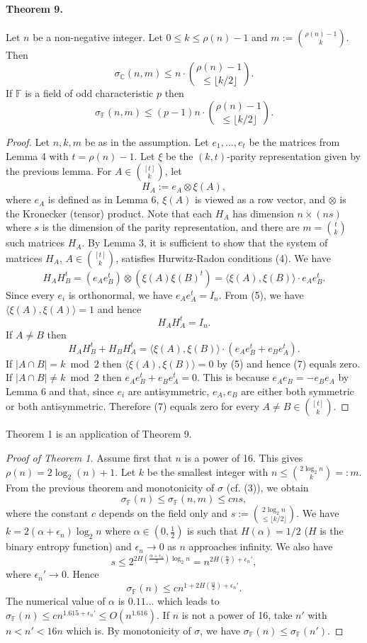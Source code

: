 \documentclass[10pt,a4paper]{article}
\begin{document}
\paragraph{Theorem 9.} Let $n$ be a non-negative integer. Let $0\le k\le\rho(n)-1$ and $m:=\binom{\rho(n)-1}k$. Then
\[\sigma_{\mathbb C}(n,m)\le n\cdot\binom{\rho(n)-1}{\le\lfloor k/2\rfloor}.\]
If $\mathbb F$ is a field of odd characteristic $p$ then
\[\sigma_{\mathbb F}(n,m)\le(p-1)n\cdot\binom{\rho(n)-1}{\le\lfloor k/2\rfloor}.\]
\begin{proof}
Let $n,k,m$ be as in the assumption. Let $e_1,\ldots,e_t$ be the matrices from Lemma 4 with $t=\rho(n)-1$. Let $\xi$ be the $(k,t)$-parity representation given by the previous lemma. For $A\in\binom{[t]}k$, let
\[H_A:=e_A\otimes\xi(A),\]
where $e_A$ is defined as in Lemma 6, $\xi(A)$ is viewed as a row vector, and $\otimes$ is the Kronecker (tensor) product.
Note that each $H_A$ has dimension $n\times(ns)$ where $s$ is the dimension of the parity representation, and there are $m=\binom tk$ such matrices $H_A$. By Lemma 3, it is sufficient to show that the system of matrices $H_A$, $A\in\binom{[t]}k$, satisfies Hurwitz-Radon conditions (4).
We have
\[H_AH_B^t=(e_Ae_B^t)\otimes(\xi(A)\xi(B)^t)=\langle\xi(A),\xi(B)\rangle\cdot e_Ae_B^t.\]
Since every $e_i$ is orthonormal, we have $e_Ae_A^t=I_n$. From (5), we have $\langle\xi(A),\xi(A)\rangle=1$ and hence
\[H_AH_A^t=I_n.\]
If $A\ne B$ then
\begin{equation}
H_AH_B^t+H_BH_A^t=\langle\xi(A),\xi(B)\rangle\cdot(e_Ae_B^t+e_Be_A^t).\tag{7}
\end{equation}
If $|A\cap B|=k\bmod2$ then $\langle\xi(A),\xi(B)\rangle=0$ by (5) and hence (7) equals zero. If $|A\cap B|\ne k\bmod2$ then $e_Ae_B^t+e_Be_A^t=0$. This is because $e_Ae_B=-e_Be_A$ by Lemma 6 and that, since $e_i$ are antisymmetric, $e_A,e_B$ are either both symmetric or both antisymmetric. Therefore (7) equals zero for every $A\ne B\in\binom{[t]}k$.
\end{proof}
Theorem 1 is an application of Theorem 9.
\begin{proof}[Proof of Theorem 1]
Assume first that $n$ is a power of 16. This gives $\rho(n)=2\log_2(n)+1$. Let $k$ be the smallest integer with $n\le\binom{2\log_2n}k=:m$. From the previous theorem and monotonicity of $\sigma$ (cf. (3)), we obtain
\[\sigma_{\mathbb F}(n)\le\sigma_{\mathbb F}(n,m)\le cns,\]
where the constant $c$ depends on the field only and $s:=\binom{2\log_2n}{\le\lfloor k/2\rfloor}$.
We have $k=2(\alpha+\epsilon_n)\log_2n$ where $\alpha\in(0,\frac12)$ is such that $H(\alpha)=1/2$ ($H$ is the binary entropy function) and $\epsilon_n\to0$ as $n$ approaches infinity. We also have
\[s\le2^{2H(\frac{\alpha+\epsilon_n}{2})\log_2n}=n^{2H(\frac\alpha2)+\epsilon_n'},\]
where $\epsilon_n'\to0$. Hence
\[\sigma_{\mathbb F}(n)\le cn^{1+2H(\frac\alpha2)+\epsilon_n'}.\]
The numerical value of $\alpha$ is $0.11\ldots$ which leads to $\sigma_{\mathbb F}(n)\le cn^{1.615+\epsilon_n'}\le O(n^{1.616})$.
If $n$ is not a power of 16, take $n'$ with $n<n'<16n$ which is. By monotonicity of $\sigma$, we have $\sigma_{\mathbb F}(n)\le\sigma_{\mathbb F}(n')$.
\end{proof}
\end{document}
